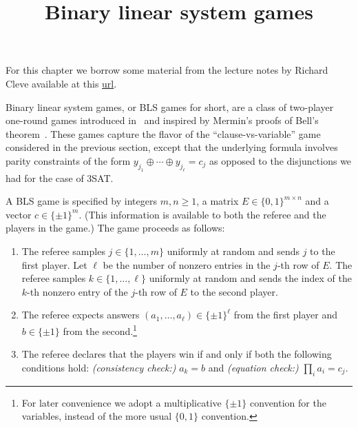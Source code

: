 





\title{Binary linear system games}
\label{blsgames}

\maketitle


\tableofcontents

For this chapter we borrow some material from the lecture notes by Richard Cleve available at this \href{http://cleve.iqc.uwaterloo.ca/resources/Qic890LectureNotes2019Apr22(V22).pdf}{url}. 

\medskip

Binary linear system games, or BLS games for short, are a class of two-player one-round  games introduced in~\cite{cleve2014characterization} and inspired by Mermin's proofs of Bell's theorem~\cite{mermin1990simple,mermin1993hidden}. These games  capture the flavor of the ``clause-vs-variable'' game considered in the previous section, except that the underlying formula involves parity constraints of the form $y_{j_1}\oplus\cdots\oplus y_{j_\ell}=c_j$ as opposed to the disjunctions we had for the case of $3$SAT. 

\begin{definition}\label{def:bls-game}
A BLS game is specified by integers $m,n\geq 1$, a matrix $E\in \{0,1\}^{m\times n}$ and a vector $c\in\{\pm 1\}^m$. (This information is available to both the referee and the players in the game.) The game proceeds as follows:
\begin{enumerate}
\item The referee samples $j\in\{1,\ldots,m\}$ uniformly at random and sends $j$ to the first player. Let $\ell$ be the number of nonzero entries in the $j$-th row of $E$. The referee samples $k\in\{1,\ldots,\ell\}$ uniformly at random and sends the index of the $k$-th nonzero entry of the $j$-th row of $E$ to the second player. 
\item The referee expects answers $(a_1,\ldots,a_\ell)\in\{\pm 1\}^\ell$ from the first player and $b\in\{\pm 1\}$ from the second.\footnote{For later convenience we adopt a multiplicative $\{\pm 1\}$ convention for the variables, instead of the more usual $\{0,1\}$ convention.}
\item The referee declares that the players win if and only if both the following conditions hold: \emph{(consistency check:)} $a_k = b$ and \emph{(equation check:)} $\prod_{i} a_i = c_j$. 
\end{enumerate}
\end{definition}

